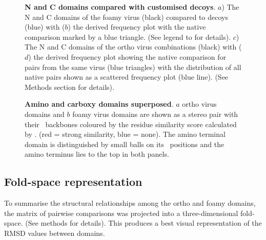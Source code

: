 \begin{figure}
\centering
{}
\begin{footnotesize}
\caption{
\label{Fig:fitsNC}
{\bf N and C domains compared with customised decoys}.
$a$) The N and C domains of the foamy virus (black) compared to decoys (blue) with ($b$) the derived frequency plot with the
native comparison marked by a blue triangle.  (See legend to  for details).
$c$) The N and C domains of the ortho virus combinations (black) with ($d$) the derived frequency plot showing the
native comparison for pairs from the same virus (blue triangles) with the distribution of all native pairs
shown as a scattered frequency plot (blue line).
(See Methods section for details).
}
\end{footnotesize}
\end{figure}

\begin{figure}
\centering
{}
\begin{footnotesize}
\caption{
\label{Fig:final}
{\bf Amino and carboxy domains superposed}.
$a$ ortho virus domains and
$b$ foamy virus domains are shown as a stereo pair with
their \CA\ backbones coloured by
the residue similarity score calculated by \SAP. (red = strong similarity, blue = none).
The amino terminal domain is distinguished by small balls on its \CA\ positions and
the amino terminus lies to the top in both panels.
}
\end{footnotesize}
\end{figure}

\subsection{Fold-space representation}

To summarise the structural relationships among the ortho and foamy domains, the matrix
of pairwise comparisons was projected into a three-dimensional fold-space.  (See methods
for details).   This produces a best visual representation of the RMSD values between domains.

